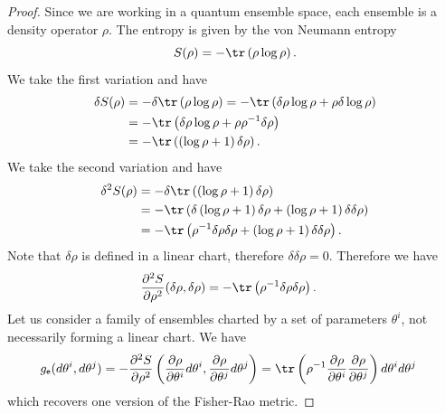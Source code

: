 \begin{mathSection}
\begin{proof}
	Since we are working in a quantum ensemble space, each ensemble is a density operator $\rho$. The entropy is given by the von Neumann entropy
	\begin{equation}
		S(\rho) = - \tr\left(\rho \log \rho\right).
	\end{equation}
	We take the first variation and have
	\begin{equation}
		\begin{aligned}
			\delta S(\rho) &= - \delta \tr\left(\rho \log \rho\right)= - \tr\left(\delta \rho \log \rho + \rho \delta \log \rho\right) \\
			&= - \tr\left(\delta \rho \log \rho + \rho \rho^{-1} \delta \rho \right) \\
			&= - \tr\left(\left(\log \rho + 1 \right) \delta \rho \right).
		\end{aligned}
	\end{equation}
	We take the second variation and have
	\begin{equation}
		\begin{aligned}
			\delta^2 S(\rho) &= - \delta \tr\left(\left(\log \rho + 1 \right) \delta \rho \right) \\
			&= - \tr\left(\delta \left(\log \rho + 1 \right) \delta \rho + \left(\log \rho + 1 \right) \delta \delta \rho \right) \\
			&= - \tr\left(\rho^{-1} \delta \rho \delta \rho + \left(\log \rho + 1 \right) \delta \delta \rho \right).
		\end{aligned}
	\end{equation}
	Note that $\delta \rho$ is defined in a linear chart, therefore $\delta \delta \rho = 0$. Therefore we have 
	\begin{equation}
		\begin{aligned}
			\frac{\partial^2 S}{\partial \rho^2}(\delta \rho, \delta \rho) &= - \tr\left(\rho^{-1} \delta \rho \delta \rho \right).
		\end{aligned}
	\end{equation}
	Let us consider a family of ensembles charted by a set of parameters $\theta^i$, not necessarily forming a linear chart. We have
	\begin{equation}
		\begin{aligned}
			g_{\ens}(d\theta^i, d\theta^j) &= - \frac{\partial^2 S}{\partial \rho^2}\left(\frac{\partial 
				\rho}{\partial \theta^i} d\theta^i, \frac{\partial 
				\rho}{\partial \theta^j} d\theta^j\right) = \tr\left( \rho^{-1} \frac{\partial \rho}{\partial \theta^i }\frac{\partial \rho}{\partial \theta^j}\right) d\theta^i d\theta^j
		\end{aligned}
	\end{equation}
	which recovers one version of the Fisher-Rao metric.
	

\end{proof}
\end{mathSection}

